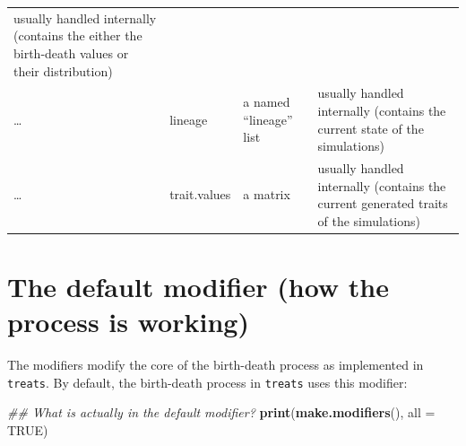 \documentclass[
]{book}
\newenvironment{Shaded}{\begin{snugshade}}{\end{snugshade}}
\newcommand{\CommentTok}[1]{\textcolor[rgb]{0.56,0.35,0.01}{\textit{#1}}}
\newcommand{\DataTypeTok}[1]{\textcolor[rgb]{0.13,0.29,0.53}{#1}}
\newcommand{\KeywordTok}[1]{\textcolor[rgb]{0.13,0.29,0.53}{\textbf{#1}}}
\newcommand{\NormalTok}[1]{#1}
\newcommand{\OtherTok}[1]{\textcolor[rgb]{0.56,0.35,0.01}{#1}}
\begin{document}
\begin{longtable}[]{@{}llll@{}}
\begin{minipage}[t]{0.33\columnwidth}
usually handled internally (contains the either the birth-death values or their distribution)\strut
\end{minipage}\tabularnewline
\begin{minipage}[t]{0.19\columnwidth}\raggedright
\ldots{}\strut
\end{minipage} & \begin{minipage}[t]{0.23\columnwidth}\raggedright
lineage\strut
\end{minipage} & \begin{minipage}[t]{0.14\columnwidth}\raggedright
a named ``lineage'' list\strut
\end{minipage} & \begin{minipage}[t]{0.33\columnwidth}\raggedright
usually handled internally (contains the current state of the simulations)\strut
\end{minipage}\tabularnewline
\begin{minipage}[t]{0.19\columnwidth}\raggedright
\ldots{}\strut
\end{minipage} & \begin{minipage}[t]{0.23\columnwidth}\raggedright
trait.values\strut
\end{minipage} & \begin{minipage}[t]{0.14\columnwidth}\raggedright
a matrix\strut
\end{minipage} & \begin{minipage}[t]{0.33\columnwidth}\raggedright
usually handled internally (contains the current generated traits of the simulations)\strut
\end{minipage}\tabularnewline
\bottomrule
\end{longtable}

\hypertarget{the-default-modifier-how-the-process-is-working}{%
\section{The default modifier (how the process is working)}\label{the-default-modifier-how-the-process-is-working}}

The modifiers modify the core of the birth-death process as implemented in \texttt{treats}.
By default, the birth-death process in \texttt{treats} uses this modifier:

\begin{Shaded}
\begin{Highlighting}[]
\CommentTok{\#\# What is actually in the default modifier?}
\KeywordTok{print}\NormalTok{(}\KeywordTok{make.modifiers}\NormalTok{(), }\DataTypeTok{all =} \OtherTok{TRUE}\NormalTok{)}
\end{Highlighting}
\end{Shaded}
\end{document}
